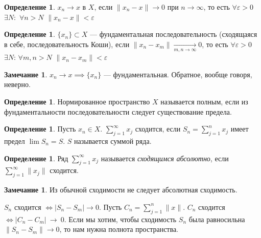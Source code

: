 \documentclass[11pt,openany,a4paper]{scrartcl}
\theoremstyle{plain}
\theoremstyle{definition}
\newtheorem{definition}[theorem]{Определение}
\newtheorem{remark}[theorem]{Замечание}
\newcommand{\underto}[1]{\xrightarrow[#1]{}}
\begin{document}
\begin{definition}
    $x_n \to x$ в $X$, если $\|x_n - x\| \to 0$ при $n \to \infty$, то есть $\forall
    \varepsilon > 0$ $\exists N$:~$\forall n > N$ $\|x_n - x\| < \varepsilon$
\end{definition}

\begin{definition}
    $\{x_n\} \subset X$ — фундаментальная последовательность (сходящаяся в себе,
    последовательность Коши), если $\|x_n - x_m\| \underto{m,n \to \infty} 0$, то есть
    $\forall \varepsilon > 0$ $\exists N$: $\forall m,n > N$ $\|x_n - x_m\| < \varepsilon$
\end{definition}

\begin{remark}
    $x_n \to x \implies \{x_n\}$ — фундаментальная. Обратное, вообще говоря, неверно.
\end{remark}
\begin{definition}
    Нормированное пространство $X$ называется полным, если из фундаментальности
    последовательности следует существование предела.
\end{definition}

\begin{definition}
    Пусть $x_n \in X$. $\sum\limits_{j = 1}^\infty x_j$ сходится, если
    $S_n = \sum\limits_{j = 1}^n x_j$ имеет предел $\lim S_n = S$. $S$ называется
    суммой ряда.
\end{definition}

\begin{definition}
    Ряд $\sum\limits_{j = 1}^\infty x_j$ называется \emph{сходящимся абсолютно},
    если $\sum\limits_{j = 1}^\infty \|x_j\|$ сходится.
\end{definition}
\begin{remark}
    Из обычной сходимости не следует абсолютная сходимость.
\end{remark}

$S_n$ сходится $\iff |S_n - S_m| \to 0$. Пусть $C_n = \sum\limits_{j = 1}^n \|x\|$.
$C_n$ сходится $\iff |C_n - C_m|~\to~0$.
Если мы хотим, чтобы сходимость $S_n$ была равносильна
$\|S_n - S_m\| \to 0$, то нам нужна полнота пространства.
\end{document}
